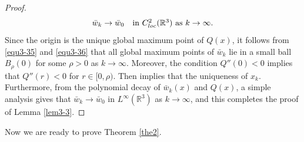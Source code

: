 \documentclass[reqno, 11pt]{amsart} %
\numberwithin{equation}{section}
\begin{document}
\begin{proof}
		\begin{equation}\label{equ3-36}
			\bar{w}_{k}\rightarrow \bar{w}_{0}\quad\hbox{in $C_{loc}^{2}(\mathbb{R}^{3})$ as $k\rightarrow\infty$.}
		\end{equation}
		Since the origin is the unique global maximum point of $Q(x)$, it follows from \eqref{equ3-35} and \eqref{equ3-36} that all global maximum points of $\bar{w}_{k}$ lie in a small ball $B_{\rho}(0)$ for some $\rho>0$ as $k\rightarrow\infty$. Moreover, the condition $Q''(0)<0$ implies that $Q''(r)<0$ for $r\in[0, \rho)$. Then \cite[Lemma 4.2]{N} implies that the uniqueness of $x_{k}$. Furthermore, from the polynomial decay of $\bar{w}_{k}(x)$ and $Q(x)$, a simple analysis gives that $	\bar{w}_{k}\rightarrow \bar{w}_{0}$ in $L^{\infty}(\mathbb{R}^{3})$ as $k\rightarrow\infty$, and this completes the proof of Lemma \ref{lem3-3}.
	\end{proof}
	
	Now we are ready to prove Theorem \ref{the2}.
	
\end{document}
